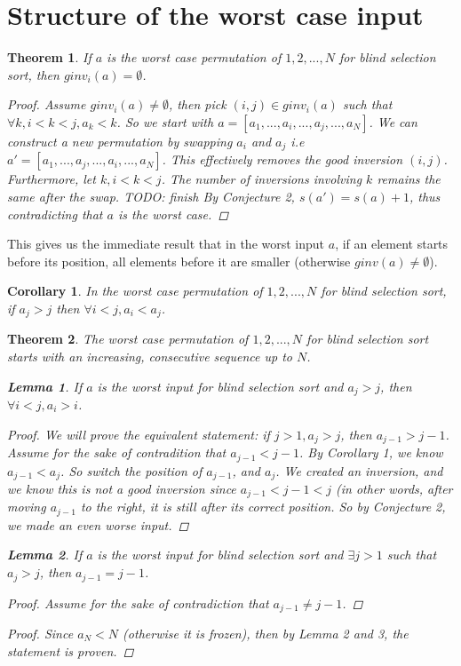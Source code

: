 \documentclass{article}
\newtheorem{lemma}{Lemma}
\newtheorem{theorem}{Theorem}
\newtheorem{corollary}{Corollary}
\begin{document}
\section{Structure of the worst case input}
\begin{theorem}
    If $a$ is the worst case permutation of $1, 2, ..., N$ for blind selection sort, then $ginv_i(a) = \emptyset$.
    \begin{proof}
        Assume $ginv_i(a) \neq \emptyset$, then pick $(i, j) \in ginv_i(a)$ such that $\forall k, i < k < j, a_k < k$.
        So we start with $a = [a_1, ... , a_i, ...,  a_j, ..., a_N]$. We can construct a new permutation by swapping $a_i$ and $a_j$
        i.e $a' = [a_1, ... , a_j, ...,  a_i, ..., a_N]$. This effectively removes the good inversion $(i, j)$.
        Furthermore, let $k, i < k < j$. The number of inversions involving $k$ remains the same after the swap. TODO: finish
        By Conjecture 2, $s(a') = s(a) + 1$, thus contradicting that $a$ is the worst case.
    \end{proof}
\end{theorem}
This gives us the immediate result that in the worst input $a$, if an element starts before its position, all elements before it are smaller (otherwise $ginv(a) \neq \emptyset$).
\begin{corollary}
    In the worst case permutation of $1, 2, ... , N$ for blind selection sort, if $a_j > j$ then $\forall i < j, a_i < a_j$.
\end{corollary}
\begin{theorem}
    The worst case permutation of $1, 2, ..., N$ for blind selection sort starts with an increasing, consecutive sequence up to $N$.
    \begin{lemma}
        If $a$ is the worst input for blind selection sort and $a_j > j$, then $ \forall i < j, a_i > i$.
        \begin{proof}
            We will prove the equivalent statement: if $j > 1, a_j > j$, then $a_{j - 1} > j - 1$.
            Assume for the sake of contradition
            that $a_{j - 1} < j - 1$. By Corollary 1, we know $a_{j - 1} < a_j$. So switch the position of
            $a_{j - 1}$, and $a_j$. We created an inversion, and we know this is not a good inversion since
            $a_{j - 1} < j - 1 < j $  (in other words, after moving $a_{j - 1}$ to the right, it is still after
            its correct position. So by Conjecture 2, we made an even worse input.
        \end{proof}
    \end{lemma}
    \begin{lemma}
        If $a$ is the worst input for blind selection sort and $\exists j > 1$ such that $a_j > j$, then $ a_{j-1} = j - 1$.
        \begin{proof}
            Assume for the sake of contradiction that $a_{j - 1} \neq j - 1$.
        \end{proof}
    \end{lemma}
    \begin{proof}
        Since $a_{N} < N$ (otherwise it is frozen), then by Lemma 2 and 3, the statement is proven.
    \end{proof}
\end{theorem}
\end{document}
